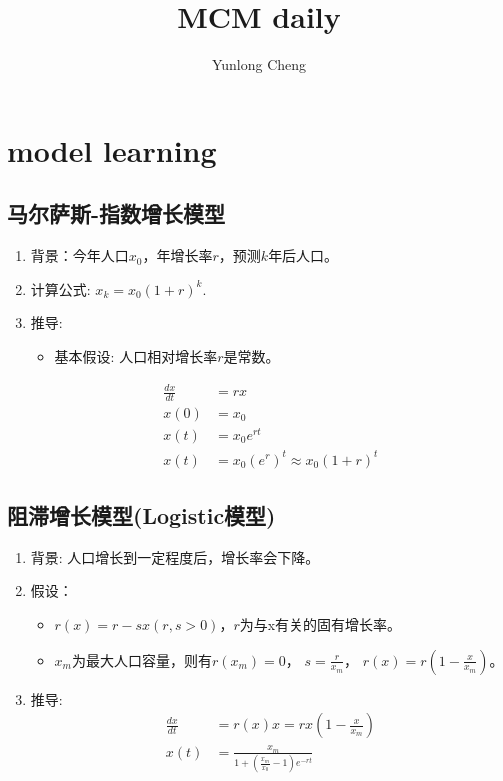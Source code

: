 \documentclass[12pt,a4paper]{article}
\title{MCM daily}
\author{Yunlong Cheng}
\begin{document}
\maketitle
\section{model learning}
\subsection{马尔萨斯-指数增长模型}
\begin{enumerate}
  \item 背景：今年人口$x_0$，年增长率$r$，预测$k$年后人口。
  \item 计算公式: $x_k = x_0(1+r)^k$.
  \item 推导:
  \begin{itemize}
    \item 基本假设: 人口相对增长率$r$是常数。
  \end{itemize}
  \begin{equation*}
    \begin{split}
      \frac{dx}{dt} &= rx \\
      x(0) &= x_0 \\
      x(t) &= x_0e^{rt} \\
      x(t) &= x_0(e^r)^t \approx x_0(1+r)^t
    \end{split}
  \end{equation*}
\end{enumerate}

\subsection{阻滞增长模型(Logistic模型)}
\begin{enumerate}
  \item 背景: 人口增长到一定程度后，增长率会下降。
  \item 假设：
  \begin{itemize}
    \item $r(x)=r-sx(r,s>0)$，$r$为与x有关的固有增长率。
    \item $x_m$为最大人口容量，则有$r(x_m) = 0$， $s = \frac{r}{x_m}$， $r(x)=r(1-\frac{x}{x_m})$。
  \end{itemize}
  \item 推导:
  \begin{equation*}
    \begin{split}
      \frac{dx}{dt}& = r(x)x = rx(1-\frac{x}{x_m})\\
      x(t)& = \frac{x_m}{1+(\frac{x_m}{x_0} - 1)e^{-rt}}
    \end{split}
  \end{equation*}
\end{enumerate}
\end{document}
